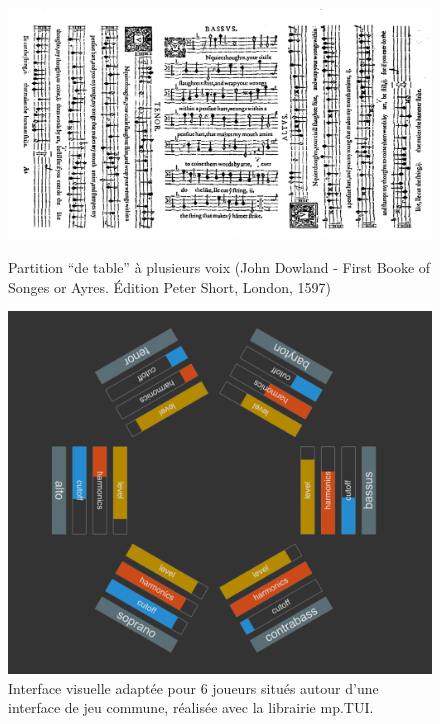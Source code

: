 \begin{figure}[!htbp]
	\captionsetup{format=plain}%
	\centering
	\begin{minipage}[t]{0.48\textwidth}
		\includegraphics[width=\linewidth]{gfx/06_visual_representation/Dowland-firstBookOfSonges.png}
		\caption[Partition ``de table'' à plusieurs voix]{Partition ``de table'' à plusieurs voix (John Dowland - First Booke of Songes or Ayres. Édition Peter Short, London, 1597)}
		\label{fig:visual_representation:table_music}
	\end{minipage}
	\hspace{.02\linewidth}
	\begin{minipage}[t]{0.48\textwidth}
	    \includegraphics[width=\linewidth]{gfx/06_visual_representation/mpTUI_multi-orientation.png}
		\caption[Interface visuelle adaptée pour 6 joueurs]{Interface visuelle adaptée pour 6 joueurs situés autour d'une interface de jeu commune, réalisée avec la librairie mp.TUI.}
		\label{fig:visual_representation:multi_orientation}
	\end{minipage}
\end{figure}

